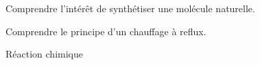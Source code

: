 \teteSndChim

\vspace*{-40pt}

\begin{objectifs}
  \item Comprendre l'intérêt de synthétiser une molécule naturelle.
  \item Comprendre le principe d'un chauffage à reflux.
\end{objectifs}

\begin{contexte}
  
  \problematique{
  }
\end{contexte}


\begin{doc}{Réaction chimique}
  \vspace*{-22pt}
  \begin{encart}

  \end{encart}

\end{doc}


